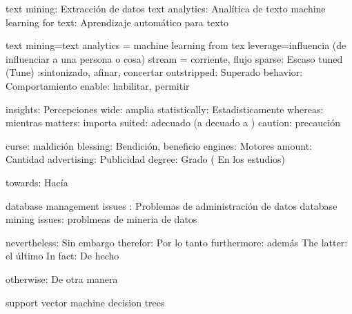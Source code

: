 




text mining: Extracción de datos
text analytics: Analítica de texto
machine learning for text: Aprendizaje automático para texto


text mining=text analytics = machine learning from tex
leverage=influencia (de influenciar a una persona o cosa)
stream = corriente, flujo
sparse: Escaso 
tuned (Tune) :sintonizado, afinar, concertar
outstripped: Superado
behavior: Comportamiento
enable: habilitar, permitir



insights: Percepciones
wide: amplia
statistically: Estadisticamente
whereas: mientras
matters: importa
suited: adecuado (a decuado a )
caution: precaución


curse: maldición
blessing: Bendición, beneficio
engines: Motores
amount: Cantidad
advertising: Publicidad
degree: Grado ( En los estudios)

towards: Hacía


database management issues : Problemas de administración de datos
database mining issues: problmeas de mineria de datos


nevertheless: Sin embargo
therefor: Por lo tanto
furthermore: además
The latter: el último
In fact: De hecho



otherwise: De otra manera




support vector machine
decision trees 
